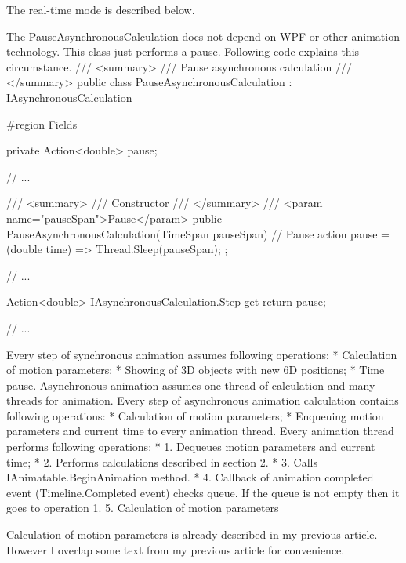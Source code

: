 \documentclass[10pt,journal,compsoc]{IEEEtran}
\begin{document}
The real-time mode is described below.

The PauseAsynchronousCalculation does not depend on WPF or other animation technology. This class just performs a pause. Following code explains this circumstance.
/// <summary>
/// Pause asynchronous calculation
/// </summary>
public class PauseAsynchronousCalculation : IAsynchronousCalculation
{
	\#region Fields
	
	private Action<double> pause;
	
	// ...
	
	/// <summary>
	/// Constructor
	/// </summary>
	/// <param name="pauseSpan">Pause</param>
	public PauseAsynchronousCalculation(TimeSpan pauseSpan)
	{
		// Pause action
		pause = (double time) =>
		{
			Thread.Sleep(pauseSpan);
		};
	}
	
	// ...
	
	Action<double> IAsynchronousCalculation.Step
	{
		get { return pause; }
	}
	
	// ...
}    
Every step of synchronous animation assumes following operations:
* Calculation of motion parameters; 
* Showing of 3D objects with new 6D positions; 
* Time pause. 
Asynchronous animation assumes one thread of calculation and many threads for animation. Every step of asynchronous animation calculation contains following operations:
* Calculation of motion parameters; 
* Enqueuing motion parameters and current time to every animation thread. 
Every animation thread performs following operations:
* 1. Dequeues motion parameters and current time; 
* 2. Performs calculations described in {section 2}. 
* 3. Calls {IAnimatable.BeginAnimation method}. 
* 4. Callback of animation completed event ({Timeline.Completed event}) checks queue. If the queue is not empty then it goes to operation 1. 
5. Calculation of motion parameters

Calculation of motion parameters is already described in {my previous article}. However I overlap some text from my previous article for convenience.
\end{document}
